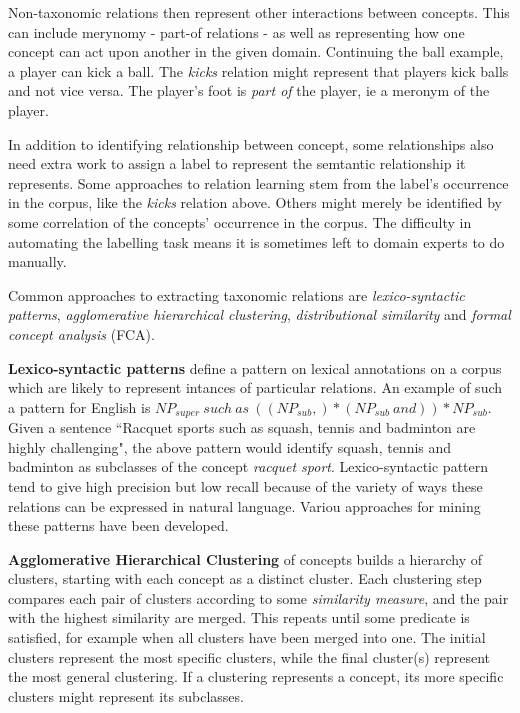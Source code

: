 \documentclass[a4paper]{report}
\begin{document}
Non-taxonomic relations then represent other interactions between concepts.
This can include merynomy - part-of relations - as well as representing how one concept can act upon another in the given domain.
Continuing the ball example, a player can kick a ball.
The \emph{kicks} relation might represent that players kick balls and not vice versa.
The player's foot is \emph{part of} the player, ie a meronym of the player.

In addition to identifying relationship between concept, some relationships also need extra work to assign a label to represent the semtantic relationship it represents.
Some approaches to relation learning stem from the label's occurrence in the corpus, like the \emph{kicks} relation above.
Others might merely be identified by some correlation of the concepts' occurrence in the corpus.
The difficulty in automating the labelling task means it is sometimes left to domain experts to do manually.

\medskip
Common approaches to extracting taxonomic relations are \emph{lexico-syntactic patterns}, \emph{agglomerative hierarchical clustering}, \emph{distributional similarity} and \emph{formal concept analysis} (FCA).

{\bfseries Lexico-syntactic patterns} define a pattern on lexical annotations on a corpus which are likely to represent intances of particular relations.
An example of such a pattern for English is $NP_{super}\ such\ as\ ((NP_{sub}, )* (NP_{sub}\ and))* NP_{sub}$.
Given a sentence ``Racquet sports such as squash, tennis and badminton are highly challenging", the above pattern would identify squash, tennis and badminton as subclasses of the concept \emph{racquet sport}.
Lexico-syntactic pattern tend to give high precision but low recall because of the variety of ways these relations can be expressed in natural language.
Variou approaches for mining these patterns have been developed.

{\bfseries Agglomerative Hierarchical Clustering} of concepts builds a hierarchy of clusters, starting with each concept as a distinct cluster.
Each clustering step compares each pair of clusters according to some \emph{similarity measure}, and the pair with the highest similarity are merged.
This repeats until some predicate is satisfied, for example when all clusters have been merged into one.
The initial clusters represent the most specific clusters, while the final cluster(s) represent the most general clustering.
If a clustering represents a concept, its more specific clusters might represent its subclasses.
\end{document}
